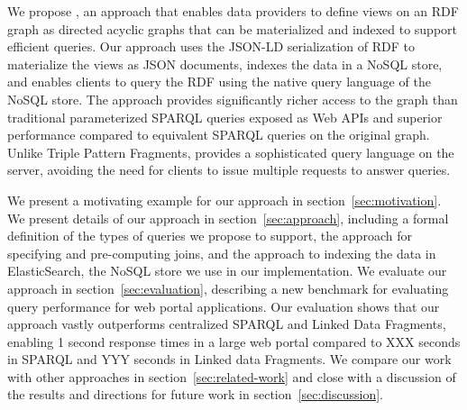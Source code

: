 We propose \ldviews, an approach that enables data providers to define views on an RDF graph as directed acyclic graphs that can be materialized and indexed to support efficient queries.
Our approach uses the JSON-LD serialization of RDF \cite{Lanthaler:2012:UJC:2307819.2307827} to materialize the views as JSON documents, indexes the data in a NoSQL store, and enables clients to query the RDF using the native query language of the NoSQL store.
%
The approach provides significantly richer access to the graph than traditional parameterized SPARQL queries exposed as Web APIs and superior performance compared to equivalent SPARQL queries on the original graph.
Unlike Triple Pattern Fragments, \ldviews provides a sophisticated query language on the server, avoiding the need for clients to issue multiple requests to answer queries. 

We present a motivating example for our approach in section~\ref{sec:motivation}.
We present details of our approach in section~\ref{sec:approach}, including a formal definition of the types of queries we propose to support, the approach for specifying and pre-computing joins, and the approach to indexing the data in ElasticSearch, the NoSQL store we use in our implementation.
We evaluate our approach in section~\ref{sec:evaluation}, describing a new benchmark for evaluating query performance for web portal applications. 
Our evaluation shows that our approach vastly outperforms centralized SPARQL and Linked Data Fragments, enabling 1 second response times in a large web portal compared to XXX seconds in SPARQL and YYY seconds in Linked data Fragments.
We compare our work with other approaches in section~\ref{sec:related-work} and close with a discussion of the results and directions for future work in section~\ref{sec:discussion}.
